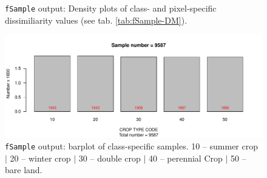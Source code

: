 \begin{figure}[p]
    \caption{\texttt{fSample} output: Density plots of class-  and  pixel-specific  dissimiliarity  values (see tab. \ref{tab:fSample-DM}).}
    \label{fig:fSample-density}
\end{figure}

\begin{figure}[H]
\centering\includegraphics[width=1\textwidth]{figures/MODIS_fergana2015_SAMPLE-NDVI-barplot_Q1.pdf}
\caption{\texttt{fSample} output: barplot of class-specific samples. 10 -- summer crop $|$ 20 -- winter crop $|$ 30 -- double crop $|$ 40 -- perennial Crop $|$ 50 -- bare land.}\label{fig:fSample-barplot}
\end{figure}

